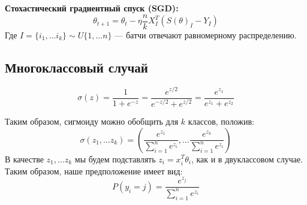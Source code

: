 \noindent\textbf{Стохастический градиентный спуск (SGD):}
\[\theta_{t + 1} = \theta_t - \eta \frac{n}{k} X_I^T(S(\theta)_I - Y_I)\]
Где \(I = \{i_1, \dots i_k\} \sim U\{1, \dots n\}\) --- батчи отвечают равномерному распределению.

\subsection{Многоклассовый случай}
\begin{note}
    \[\sigma(z) = \frac{1}{1 + e^{-z}} = \frac{e^{z/2}}{e^{-z/2} + e^{z/2}} = \frac{e^{z_1}}{e^{z_1} + e^{z_2}}\]
\end{note}

Таким образом, сигмоиду можно обобщить для \(k\) классов, положив:
\[\sigma(z_1, \dots z_k) = \left( \frac{e^{z_1}}{\sum_{i = 1}^n e^{z_i}}, \dots \frac{e^{z_k}}{\sum_{i = 1}^n e^{z_i}} \right)\]
В качестве \(z_1, \dots z_k\) мы будем подставлять \(z_i = x_i^T \theta_i\), как и в двуклассовом случае. Таким образом, наше предположение имеет вид:
\[P(y_i = j) = \frac{e^{z_j}}{\sum_{i = 1}^n e^{z_i}}\]







